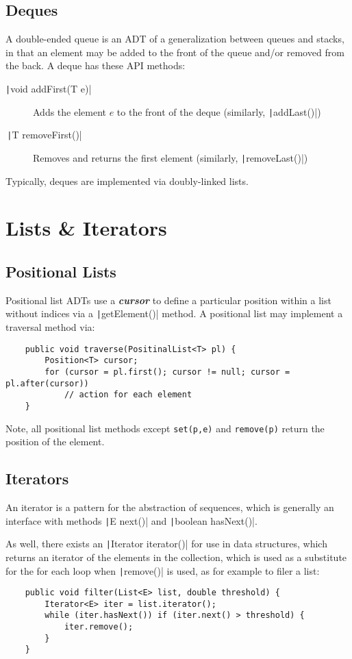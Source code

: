 \documentclass[12pt, letterpaper]{article}
\begin{document}
\subsection{Deques }
A double-ended queue is an ADT of a generalization between queues and stacks, in that an element may be added to the front of the queue and/or removed from the back. A deque has these API methods:
\begin{description}
    \item[\texttt|void addFirst(T e)|] Adds the element $e$ to the front of the deque (similarly, \texttt|addLast()|)
    \item[\quad\,\;\texttt|T removeFirst()|] Removes and returns the first element (similarly, \texttt|removeLast()|)
\end{description}
Typically, deques are implemented via doubly-linked lists.

\newpage

\section{Lists \& Iterators}

\subsection{Positional Lists }
Positional list ADTs use a \textbf{\textit{cursor}} to define a particular position within a list without indices via a \texttt|getElement()| method. A positional list may implement a traversal method via:
\begin{verbatim}
    public void traverse(PositinalList<T> pl) {
        Position<T> cursor;
        for (cursor = pl.first(); cursor != null; cursor = pl.after(cursor))
            // action for each element
    }
\end{verbatim}
Note, all positional list methods except \verb|set(p,e)| and \verb|remove(p)| return the position of the element.

\subsection{Iterators}
An iterator is a pattern for the abstraction of sequences, which is generally an interface with methods \texttt|E next()| and \texttt|boolean hasNext()|.

\bigskip
As well, there exists an \texttt|Iterator iterator()| for use in data structures, which returns an iterator of the elements in the collection, which is used as a substitute for the for each loop when \texttt|remove()| is used, as for example to filer a list:
\begin{verbatim}
    public void filter(List<E> list, double threshold) {
        Iterator<E> iter = list.iterator();
        while (iter.hasNext()) if (iter.next() > threshold) {
            iter.remove();
        }
    }
\end{verbatim}
\end{document}

